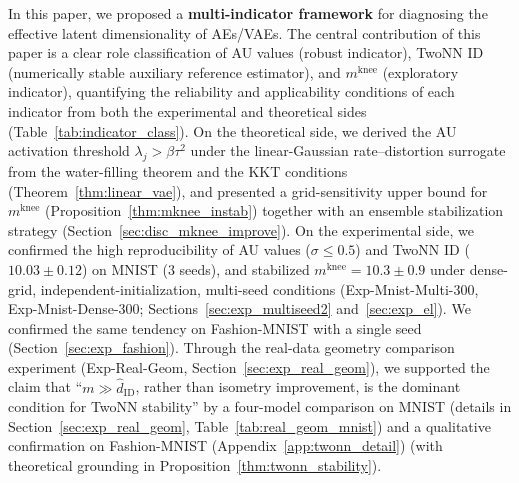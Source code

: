 \documentclass[make,article,submit,pdftex,moreauthors]{Definitions/mdpi}
\newcommand{\mknee}{m^{\mathrm{knee}}}
\begin{document}
In this paper, we proposed a \textbf{multi-indicator framework} for diagnosing
the effective latent dimensionality of AEs/VAEs.
The central contribution of this paper is a clear role classification of AU
values (robust indicator), TwoNN ID (numerically stable auxiliary reference
estimator), and $\mknee$ (exploratory indicator), quantifying the reliability
and applicability conditions of each indicator from both the experimental and
theoretical sides (Table~\ref{tab:indicator_class}).
On the theoretical side, we derived the AU activation threshold
$\lambda_j > \beta\tau^2$ under the linear-Gaussian rate--distortion surrogate
from the water-filling theorem and the KKT conditions
(Theorem~\ref{thm:linear_vae}), and presented a grid-sensitivity upper bound
for $\mknee$ (Proposition~\ref{thm:mknee_instab}) together with an ensemble
stabilization strategy (Section~\ref{sec:disc_mknee_improve}).
On the experimental side, we confirmed the high reproducibility of AU values
($\sigma \leq 0.5$) and TwoNN ID ($10.03 \pm 0.12$) on MNIST (3 seeds), and
stabilized $\mknee = 10.3 \pm 0.9$ under dense-grid,
independent-initialization, multi-seed conditions
(Exp-Mnist-Multi-300, Exp-Mnist-Dense-300;
Sections~\ref{sec:exp_multiseed2} and~\ref{sec:exp_el}).
We confirmed the same tendency on Fashion-MNIST with a single seed
(Section~\ref{sec:exp_fashion}).
Through the real-data geometry comparison experiment
(Exp-Real-Geom, Section~\ref{sec:exp_real_geom}), we supported the claim that
``$m \gg \hat{d}_\mathrm{ID}$, rather than isometry improvement, is the
dominant condition for TwoNN stability'' by a four-model comparison on MNIST
(details in Section~\ref{sec:exp_real_geom}, Table~\ref{tab:real_geom_mnist})
and a qualitative confirmation on Fashion-MNIST
(Appendix~\ref{app:twonn_detail})
(with theoretical grounding in Proposition~\ref{thm:twonn_stability}).
\end{document}
